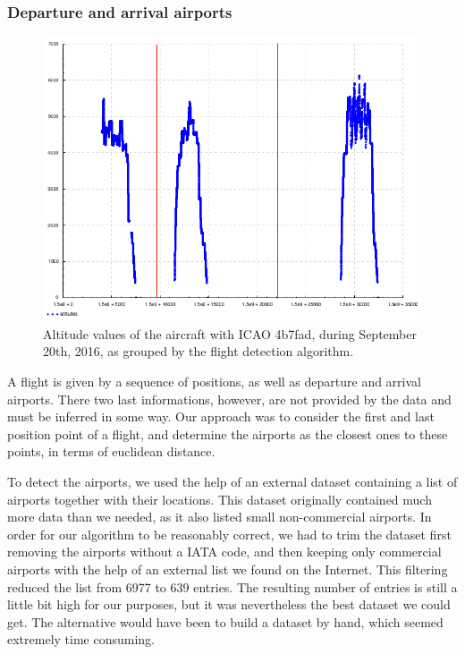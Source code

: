 \documentclass{vldb}
\begin{document}
\subsubsection{Departure and arrival airports}

\begin{figure}[t]
  \centering
  \includegraphics[scale=0.28]{imgs/4b7fad-altitudes-grouped.png}
  \caption{Altitude values of the aircraft with ICAO 4b7fad, during September
    20th, 2016, as grouped by the flight detection algorithm.}
  \label{fig:alts}
\end{figure}

A flight is given by a sequence of positions, as well as departure and arrival
airports. There two last informations, however, are not provided by the data and
must be inferred in some way. Our approach was to consider the first and last
position point of a flight, and determine the airports as the closest ones to
these points, in terms of euclidean distance.

To detect the airports, we used the help of an external dataset containing a
list of airports together with their locations. This dataset originally
contained much more data than we needed, as it also listed small non-commercial
airports. In order for our algorithm to be reasonably correct, we had to trim
the dataset first removing the airports without a IATA code, and then keeping
only commercial airports with the help of an external list we found on the
Internet. This filtering reduced the list from 6977 to 639 entries.
The resulting number of entries is still a little bit high for our purposes, but
it was nevertheless the best dataset we could get. The alternative would have
been to build a dataset by hand, which seemed extremely time consuming.
\end{document}
